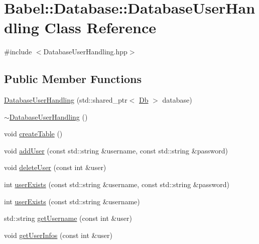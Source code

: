 \hypertarget{classBabel_1_1Database_1_1DatabaseUserHandling}{}\section{Babel\+:\+:Database\+:\+:Database\+User\+Handling Class Reference}
\label{classBabel_1_1Database_1_1DatabaseUserHandling}


{\ttfamily \#include $<$Database\+User\+Handling.\+hpp$>$}

\subsection*{Public Member Functions}
\begin{DoxyCompactItemize}
\item 
\hyperlink{classBabel_1_1Database_1_1DatabaseUserHandling_a2d96ea5163d60bfb811d76c94bd3a9c5}{Database\+User\+Handling} (std\+::shared\+\_\+ptr$<$ \hyperlink{classBabel_1_1Database_1_1Db}{Db} $>$ database)
\item 
\hyperlink{classBabel_1_1Database_1_1DatabaseUserHandling_a6f7e868435c61dfe61530b79aff5d8bc}{$\sim$\+Database\+User\+Handling} ()
\item 
void \hyperlink{classBabel_1_1Database_1_1DatabaseUserHandling_a40d154b5566be2fbe256b73bb4b1298b}{create\+Table} ()
\item 
void \hyperlink{classBabel_1_1Database_1_1DatabaseUserHandling_a042cde852c992def282d1a1d1dd9852b}{add\+User} (const std\+::string \&username, const std\+::string \&password)
\item 
void \hyperlink{classBabel_1_1Database_1_1DatabaseUserHandling_aa50ebfb9d50954f228772f0a9132aabb}{delete\+User} (const int \&user)
\item 
int \hyperlink{classBabel_1_1Database_1_1DatabaseUserHandling_a3bbd5ae39cfdc6f7e37eabdd8dab624d}{user\+Exists} (const std\+::string \&username, const std\+::string \&password)
\item 
int \hyperlink{classBabel_1_1Database_1_1DatabaseUserHandling_a9dcfc77a907122ae9d1e45fa415e1002}{user\+Exists} (const std\+::string \&username)
\item 
std\+::string \hyperlink{classBabel_1_1Database_1_1DatabaseUserHandling_a25fb3f6cf468ac2020437c0970ecf3d4}{get\+Username} (const int \&user)
\item 
void \hyperlink{classBabel_1_1Database_1_1DatabaseUserHandling_ae1f2d2a9c0981e124b5025e6f437769e}{get\+User\+Infos} (const int \&user)
\end{DoxyCompactItemize}



